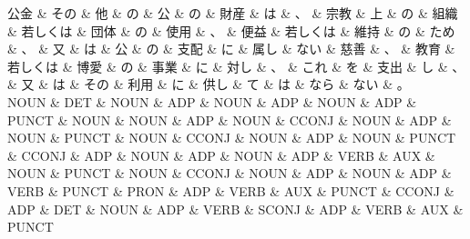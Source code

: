 \documentclass[tikz,border=5pt]{standalone}
\begin{document}
\small
\begin{dependency}[edge unit distance=6.6pt]
    \begin{deptext}[column sep=0.5em]
        公金 \& その \& 他 \& の \& 公 \& の \& 財産 \& は \& 、 \& 宗教 \& 上 \& の \& 組織 \& 若しくは \& 団体 \& の \& 使用 \& 、 \& 便益 \& 若しくは \& 維持 \& の \& ため \& 、 \& 又 \& は \& 公 \& の \& 支配 \& に \& 属し \& ない \& 慈善 \& 、 \& 教育 \& 若しくは \& 博愛 \& の \& 事業 \& に \& 対し \& 、 \& これ \& を \& 支出 \& し \& 、 \& 又 \& は \& その \& 利用 \& に \& 供し \& て \& は \& なら \& ない \& 。\\
        NOUN \& DET \& NOUN \& ADP \& NOUN \& ADP \& NOUN \& ADP \& PUNCT \& NOUN \& NOUN \& ADP \& NOUN \& CCONJ \& NOUN \& ADP \& NOUN \& PUNCT \& NOUN \& CCONJ \& NOUN \& ADP \& NOUN \& PUNCT \& CCONJ \& ADP \& NOUN \& ADP \& NOUN \& ADP \& VERB \& AUX \& NOUN \& PUNCT \& NOUN \& CCONJ \& NOUN \& ADP \& NOUN \& ADP \& VERB \& PUNCT \& PRON \& ADP \& VERB \& AUX \& PUNCT \& CCONJ \& ADP \& DET \& NOUN \& ADP \& VERB \& SCONJ \& ADP \& VERB \& AUX \& PUNCT\\
    \end{deptext}
\end{dependency}
\end{document}

